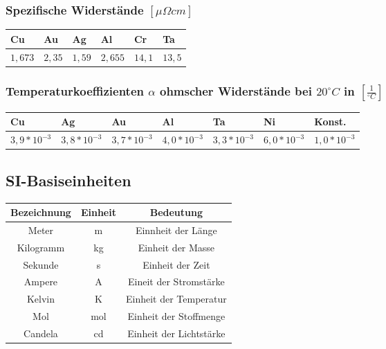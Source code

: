 \documentclass[12pt,a4paper]{article}%
\numberwithin{equation}{section}
\numberwithin{equation}{subsection}
\begin{document}
	\subsubsection{Spezifische Widerstände $\left[\mu \Omega cm \right]$}
\begin{tabularx}{14.7cm}{|X|X|X|X|X|X|}\hline
Cu & Au & Ag & Al & Cr & Ta \\ \hline
$1,673$ & $2,35$ & $1,59$ & $2,655$ & $14,1$ & $13,5$ \\ \hline
\end{tabularx}

\subsubsection{Temperaturkoeffizienten $\alpha$ ohmscher Widerstände bei $20^{\circ} C$ in $\left[\frac{1}{^{\circ} C} \right]$}
\begin{tabularx}{14.7cm}{|X|X|X|X|X|X|X|} \hline
Cu & Ag & Au & Al & Ta & Ni & Konst. \\ \hline
$3,9 * 10^{-3}$ & $3,8 * 10^{-3}$ & $3,7 * 10^{-3}$ & $4,0 * 10^{-3}$ & $3,3 * 10^{-3}$ & $6,0 * 10^{-3}$ & $1,0 * 10^{-3}$ \\ \hline
\end{tabularx}
\subsection{SI-Basiseinheiten}
\begin{tabular} {|c|c|c|}\hline
Bezeichnung & Einheit & Bedeutung \\ \hline
Meter & m & Einnheit der Länge \\ \hline
Kilogramm & kg & Einheit der Masse \\ \hline
Sekunde & s & Einheit der Zeit \\ \hline
Ampere & A & Eineit der Stromstärke \\ \hline
Kelvin & K & Einheit der Temperatur \\ \hline
Mol & mol & Einheit der Stoffmenge \\ \hline
Candela & cd & Einheit der Lichtstärke \\ \hline
\end{tabular}
\end{document}
